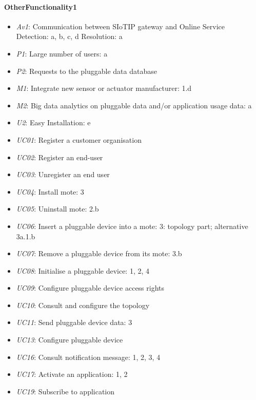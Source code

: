     \paragraph{OtherFunctionality1}
        \begin{itemize}
            \item \emph{Av1}: Communication between SIoTIP gateway and Online Service \\
                               Detection: a, b, c, d
                               Resolution: a
           	\item \emph{P1}: Large number of users: a
            \item \emph{P2}: Requests to the pluggable data database
            \item \emph{M1}: Integrate new sensor or actuator manufacturer: 1.d
            \item \emph{M2}: Big data analytics on pluggable data and/or application usage data: a
            \item \emph{U2}: Easy Installation: e
            \item \emph{UC01}: Register a customer organisation
            \item \emph{UC02}: Register an end-user
            \item \emph{UC03}: Unregister an end user
            \item \emph{UC04}: Install mote: 3
            \item \emph{UC05}: Uninstall mote: 2.b
            \item \emph{UC06}: Insert a pluggable device into a mote: 3: topology part; alternative 3a.1.b
            \item \emph{UC07}: Remove a pluggable device from its mote: 3.b
            \item \emph{UC08}: Initialise a pluggable device: 1, 2, 4
            \item \emph{UC09}: Configure pluggable device access rights
            \item \emph{UC10}: Consult and configure the topology
            \item \emph{UC11}: Send pluggable device data: 3
            \item \emph{UC13}: Configure pluggable device
            \item \emph{UC16}: Consult notification message: 1, 2, 3, 4
            \item \emph{UC17}: Activate an application: 1, 2
            \item \emph{UC19}: Subscribe to application

\end{itemize}
